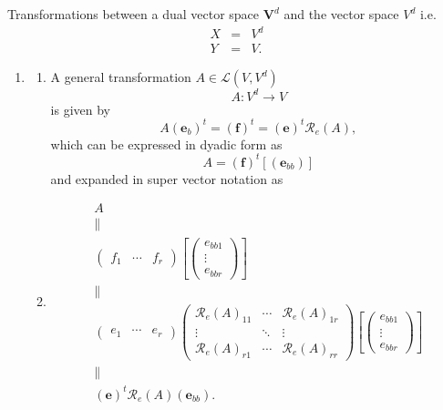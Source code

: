 \documentclass[aps,preprint]{revtex4}
\begin{document}
Transformations between a dual vector space $\boldsymbol{V}^{d}$ and the
vector space $V^{d}$ i.e. 
\begin{eqnarray}
X &=&V^{d} \\
Y &=&V.
\end{eqnarray}

\begin{enumerate}
\item 
\begin{enumerate}
\item A general transformation $A\in \mathcal{L}\left( V,V^{d}\right) $ 
\begin{equation}
A:V^{d}\rightarrow V
\end{equation}%
is given by 
\begin{equation}
A\left( \boldsymbol{e}_{b}\right) ^{t}=\left( \boldsymbol{f}\right)
^{t}=\left( \boldsymbol{e}\right) ^{t}\mathcal{R}_{e}\left( A\right) ,
\end{equation}%
which can be expressed in dyadic form as 
\begin{equation}
A=\left( \boldsymbol{f}\right) ^{t}\left[ \left( \boldsymbol{e}_{bb}\right) %
\right]
\end{equation}%
and expanded in super vector notation as

\item 
\begin{gather}
A \\
\parallel \\
\left( 
\begin{array}{ccc}
f_{1} & \cdots & f_{r}%
\end{array}%
\right) \left[ \left( 
\begin{array}{c}
e_{bb1} \\ 
\vdots \\ 
e_{bbr}%
\end{array}%
\right) \right] \\
\parallel \\
\left( 
\begin{array}{ccc}
e_{1} & \cdots & e_{r}%
\end{array}%
\right) \left( 
\begin{array}{ccc}
\mathcal{R}_{e}\left( A\right) _{11} & \cdots & \mathcal{R}_{e}\left(
A\right) _{1r} \\ 
\vdots & \ddots & \vdots \\ 
\mathcal{R}_{e}\left( A\right) _{r1} & \cdots & \mathcal{R}_{e}\left(
A\right) _{rr}%
\end{array}%
\right) \left[ \left( 
\begin{array}{c}
e_{bb1} \\ 
\vdots \\ 
e_{bbr}%
\end{array}%
\right) \right] \\
\parallel \\
\left( \boldsymbol{e}\right) ^{t}\mathcal{R}_{e}\left( A\right) \left( 
\boldsymbol{e}_{bb}\right) .
\end{gather}


\end{enumerate}
\end{enumerate}
\end{document}
